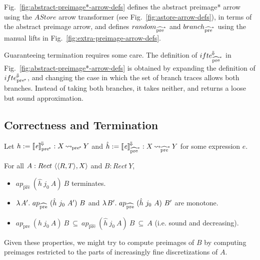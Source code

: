 \documentclass{llncs}
\newcommand{\figref}[1]{Fig.~\ref{#1}}
\newcommand{\arrow}{\rightsquigarrow}
\newcommand{\conv}{^{\mspace{-2mu}\Downarrow\mspace{-2mu}}}
\newcommand{\meaningofconv}[1]{\left\llbracket{#1}\right\rrbracket\conv}
\newcommand{\pre}{_\mathrm{pre}}
\newcommand{\ppre}{_\mathrm{pre^{\mspace{-2mu}*}}}
\newcommand{\prehat}{_\mathrm{\widehat{pre}}}
\newcommand{\pprehat}{_\mathrm{\widehat{pre}^{\mspace{-2mu}*}}}
\DeclareMathOperator{\ppreto}{{\arrow\mspace{-1mu}}\ppre}
\DeclareMathOperator{\pprehatto}{{\arrow\mspace{-1mu}}\pprehat}
\begin{document}
\figref{fig:abstract-preimage*-arrow-defs} defines the abstract preimage* arrow using the $AStore$ arrow transformer (see \figref{fig:astore-arrow-defs}), in terms of the abstract preimage arrow, and defines $random\pprehat$ and $branch\pprehat$ using the manual lifts in \figref{fig:extra-preimage-arrow-defs}.

Guaranteeing termination requires some care.
The definition of $ifte\conv\pprehat$ in \figref{fig:abstract-preimage*-arrow-defs} is obtained by expanding the definition of $ifte\conv\ppre$, and changing the case in which the set of branch traces allows both branches.
Instead of taking both branches, it takes neither, and returns a loose but sound approximation.

\subsection{Correctness and Termination}

Let $h := \meaningofconv{\mathit{e}}\ppre : X \ppreto Y$ and $\hat{h} := \meaningofconv{\mathit{e}}\pprehat : X \pprehatto Y$ for some expression $\mathit{e}$.

\begin{theorem}
\label{thm:correctness}%
For all $A : Rect~\langle{\langle{R,T}\rangle,X}\rangle$ and $B : Rect~Y$,
\begin{itemize}
	\item $ap\prehat~(\hat{h}~j_0~A)~B$ terminates.
	\item $\fun{A'}{ap\prehat~(\hat{h}~j_0~A')~B}$ and $\fun{B'}{ap\prehat~(\hat{h}~j_0~A)~B'}$ are monotone.
	\item $ap\pre~(h~j_0~A)~B \ \subseteq \ ap\prehat~(\hat{h}~j_0~A)~B \ \subseteq \ A$ (i.e. sound and decreasing).
\end{itemize}%
\end{theorem}

Given these properties, we  might try to compute preimages of $B$ by computing preimages restricted to the parts of increasingly fine discretizations of $A$.
\end{document}
